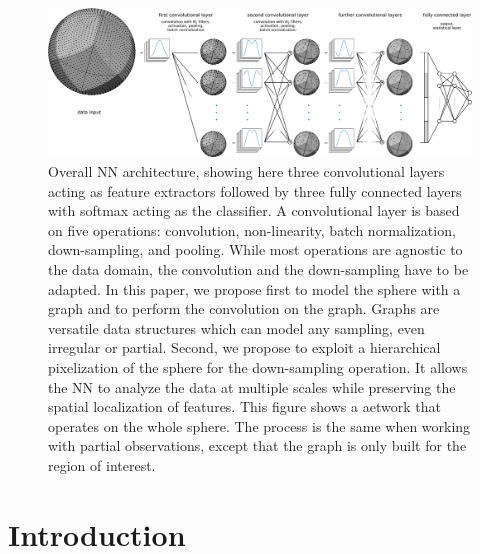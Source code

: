 \documentclass[final,twocolumn,3p,times,sort&compress]{elsarticle}
\newcommand{\1}{\b{1}}              %
\newcommand{\0}{\b{0}}              %
\begin{document}
\begin{figure}
	\centering
	\includegraphics[width=\linewidth]{figure_architecture_v3}
	\caption{Overall NN architecture, showing here three convolutional layers acting as feature extractors followed by three fully connected layers with softmax acting as the classifier.
    A convolutional layer is based on five operations: convolution, non-linearity, batch normalization, down-sampling, and pooling.
	While most operations are agnostic to the data domain, the convolution and the down-sampling have to be adapted.
	In this paper, we propose first to model the sphere with a graph and to perform the convolution on the graph.
	Graphs are versatile data structures which can model any sampling, even irregular or partial.
	Second, we propose to exploit a hierarchical pixelization of the sphere for the down-sampling operation.
	It allows the NN to analyze the data at multiple scales while preserving the spatial localization of features.
	This figure shows a aetwork that operates on the whole sphere.
	The process is the same when working with partial observations, except that the graph is only built for the region of interest.}
	\label{fig:architecture}
\end{figure}

\section{Introduction}
\label{sec:intro}
\end{document}

